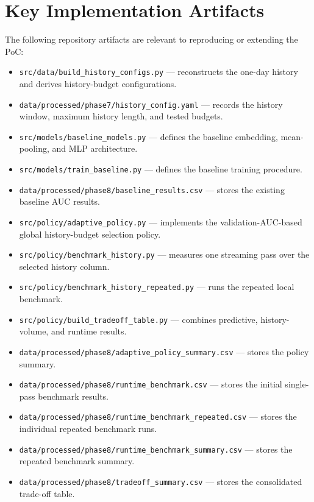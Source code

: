 \documentclass[11pt,a4paper]{article}
\begin{document}
\section{Key Implementation Artifacts}
The following repository artifacts are relevant to reproducing or extending the PoC:
\begin{itemize}
    \item \texttt{src/data/build\_history\_configs.py} --- reconstructs the one-day history and derives history-budget configurations.
    \item \texttt{data/processed/phase7/history\_config.yaml} --- records the history window, maximum history length, and tested budgets.
    \item \texttt{src/models/baseline\_models.py} --- defines the baseline embedding, mean-pooling, and MLP architecture.
    \item \texttt{src/models/train\_baseline.py} --- defines the baseline training procedure.
    \item \texttt{data/processed/phase8/baseline\_results.csv} --- stores the existing baseline AUC results.
    \item \texttt{src/policy/adaptive\_policy.py} --- implements the validation-AUC-based global history-budget selection policy.
    \item \texttt{src/policy/benchmark\_history.py} --- measures one streaming pass over the selected history column.
    \item \texttt{src/policy/benchmark\_history\_repeated.py} --- runs the repeated local benchmark.
    \item \texttt{src/policy/build\_tradeoff\_table.py} --- combines predictive, history-volume, and runtime results.
    \item \texttt{data/processed/phase8/adaptive\_policy\_summary.csv} --- stores the policy summary.
    \item \texttt{data/processed/phase8/runtime\_benchmark.csv} --- stores the initial single-pass benchmark results.
    \item \texttt{data/processed/phase8/runtime\_benchmark\_repeated.csv} --- stores the individual repeated benchmark runs.
    \item \texttt{data/processed/phase8/runtime\_benchmark\_summary.csv} --- stores the repeated benchmark summary.
    \item \texttt{data/processed/phase8/tradeoff\_summary.csv} --- stores the consolidated trade-off table.
\end{itemize}
\end{document}
